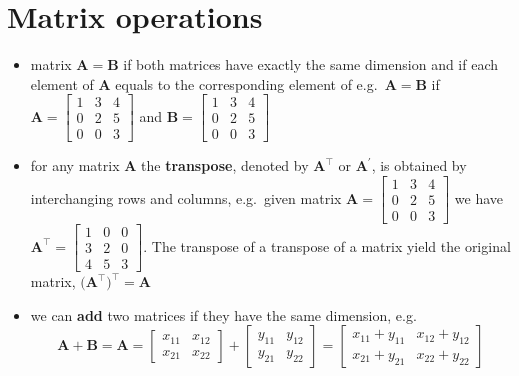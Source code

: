 \documentclass[
]{book}
\providecommand{\tightlist}{%
  \setlength{\itemsep}{0pt}\setlength{\parskip}{0pt}}
\theoremstyle{definition}
\theoremstyle{definition}
\theoremstyle{definition}
\theoremstyle{remark}
\begin{document}
\hypertarget{matrix-operations}{%
\section{Matrix operations}\label{matrix-operations}}

\begin{itemize}
\tightlist
\item
  matrix \(\mathbf{A} = \mathbf{B}\) if both matrices have exactly the same dimension and if each element of \(\mathbf{A}\) equals to the corresponding element of e.g.~\(\mathbf{A} = \mathbf{B}\) if
  \(\mathbf{A}=\begin{bmatrix} 1 & 3 & 4 \\ 0 & 2 & 5 \\ 0 & 0 & 3 \end{bmatrix}\) and \(\mathbf{B}=\begin{bmatrix} 1 & 3 & 4 \\ 0 & 2 & 5 \\ 0 & 0 & 3 \end{bmatrix}\)
\end{itemize}

\begin{itemize}
\tightlist
\item
  for any matrix \(\mathbf{A}\) the \textbf{transpose}, denoted by \(\mathbf{A}^\top\) or \(\mathbf{A}^\prime\), is obtained by interchanging rows and columns, e.g.~given matrix \(\mathbf{A}=\begin{bmatrix} 1 & 3 & 4 \\ 0 & 2 & 5 \\ 0 & 0 & 3 \end{bmatrix}\) we have \(\mathbf{A}^\top=\begin{bmatrix} 1 & 0 & 0 \\ 3 & 2 & 0 \\ 4 & 5 & 3 \end{bmatrix}\). The transpose of a transpose of a matrix yield the original matrix, \(\Big(\mathbf{A}^\top\Big)^\top = \mathbf{A}\)
\end{itemize}

\begin{itemize}
\tightlist
\item
  we can \textbf{add} two matrices if they have the same dimension, e.g.~
  \[\mathbf{A} + \mathbf{B} = \mathbf{A} =\begin{bmatrix}
  x_{11} & x_{12}   \\
  x_{21} & x_{22} 
  \end{bmatrix} + \begin{bmatrix}
  y_{11} & y_{12}   \\
  y_{21} & y_{22} 
  \end{bmatrix} = \begin{bmatrix}
  x_{11}+y_{11} & x_{12}+y_{12}   \\
  x_{21}+y_{21} & x_{22}+y_{22} 
  \end{bmatrix}\]
\end{itemize}
\end{document}
